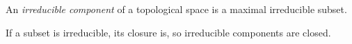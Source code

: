 \documentclass[12pt]{article}
\begin{document}
An {\em irreducible component} of a topological space is a maximal irreducible subset.

If a subset is irreducible, its closure is, so irreducible components are closed.
\end{document}
